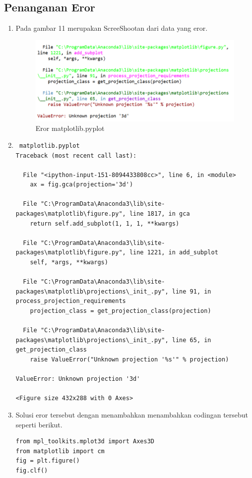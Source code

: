 \subsection{Penanganan Eror}
\begin{enumerate}
\item Pada gambar 11 merupakan ScreeShootan dari data yang eror.
\begin{figure}[ht]
	\centerline{\includegraphics[width=1\textwidth]{figures/c4P/11.PNG}}
	\caption{Eror matplotlib.pyplot}
	\label{c4_16}
\end{figure}

\item 
\begin{verbatim}
 matplotlib.pyplot
Traceback (most recent call last):

  File "<ipython-input-151-8094433808cc>", line 6, in <module>
    ax = fig.gca(projection='3d')

  File "C:\ProgramData\Anaconda3\lib\site-packages\matplotlib\figure.py", line 1817, in gca
    return self.add_subplot(1, 1, 1, **kwargs)

  File "C:\ProgramData\Anaconda3\lib\site-packages\matplotlib\figure.py", line 1221, in add_subplot
    self, *args, **kwargs)

  File "C:\ProgramData\Anaconda3\lib\site-packages\matplotlib\projections\_init_.py", line 91, in process_projection_requirements
    projection_class = get_projection_class(projection)

  File "C:\ProgramData\Anaconda3\lib\site-packages\matplotlib\projections\_init_.py", line 65, in get_projection_class
    raise ValueError("Unknown projection '%s'" % projection)

ValueError: Unknown projection '3d'

<Figure size 432x288 with 0 Axes>
\end{verbatim}

\item Solusi eror tersebut dengan menambahkan  menambahkan codingan tersebut seperti berikut.
\begin{verbatim}
from mpl_toolkits.mplot3d import Axes3D
from matplotlib import cm
fig = plt.figure()
fig.clf()
\end{verbatim}
\end{enumerate}